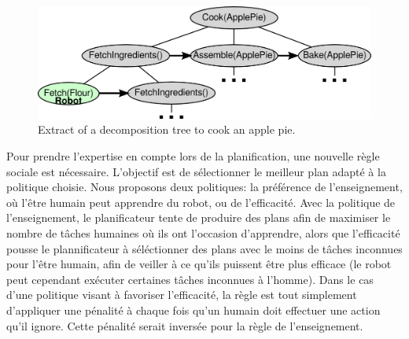 \documentclass[a4paper,11pt,twoside]{StyleThese}
\begin{document}
\begin{figure}[ht!]
 \centering
  \includegraphics[width=0.47
 \textwidth]{img/plan.png}
 \caption{Extract of a decomposition tree to cook an apple pie.}
 \label{fig:treePlan}
   \vspace{-20pt}
 \end{figure}
 
Pour prendre l'expertise en compte lors de la planification, une nouvelle règle sociale est nécessaire. L'objectif est de sélectionner le meilleur plan adapté à la politique choisie. Nous proposons deux politiques: la préférence de l'enseignement, où l'être humain peut apprendre du robot, ou de l'efficacité. Avec la politique de l'enseignement, le planificateur tente de produire des plans afin de maximiser le nombre de tâches humaines où ils ont l'occasion d'apprendre, alors que l'efficacité pousse le plannificateur à séléctionner des plans avec le moins de tâches inconnues pour l'être humain, afin de veiller à ce qu'ils puissent être plus efficace (le robot peut cependant exécuter certaines tâches inconnues à l'homme).
Dans le cas d'une politique visant à favoriser l'efficacité, la règle est tout simplement d'appliquer une pénalité à chaque fois qu'un humain doit effectuer une action qu'il ignore. Cette pénalité serait inversée pour la règle de l'enseignement.
\end{document}
